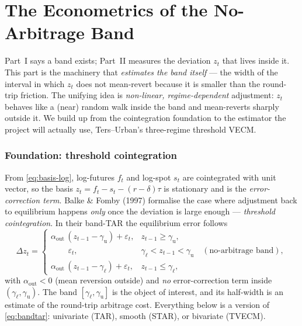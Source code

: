 \part{The Econometrics of the No-Arbitrage Band}
\label{part:econometrics}

Part~I says a band exists; Part~II measures the deviation $z_t$ that lives inside it. This part is the machinery that \emph{estimates the band itself} --- the width of the interval in which $z_t$ does not mean-revert because it is smaller than the round-trip friction. The unifying idea is \emph{non-linear, regime-dependent} adjustment: $z_t$ behaves like a (near) random walk inside the band and mean-reverts sharply outside it. We build up from the cointegration foundation to the estimator the project will actually use, Ters--Urban's three-regime threshold VECM.

\section{Foundation: threshold cointegration}
\label{sec:threshold-coint}
From \eqref{eq:basis-log}, log-futures $f_t$ and log-spot $s_t$ are cointegrated with unit vector, so the basis $z_t = f_t - s_t - (r-\delta)\tau$ is stationary and is the \emph{error-correction term}. Balke \& Fomby (1997) formalise the case where adjustment back to equilibrium happens \emph{only} once the deviation is large enough --- \emph{threshold cointegration}. In their band-TAR the equilibrium error follows
\begin{equation}
\Delta z_t = \begin{cases} \alpha_{\text{out}}\,(z_{t-1}-\gamma_{\text{u}}) + \varepsilon_t, & z_{t-1} \ge \gamma_{\text{u}},\\[3pt] \phantom{\alpha_{\text{out}}(}\varepsilon_t, & \gamma_{\ell} < z_{t-1} < \gamma_{\text{u}} \quad(\text{no-arbitrage band}),\\[3pt] \alpha_{\text{out}}\,(z_{t-1}-\gamma_{\ell}) + \varepsilon_t, & z_{t-1} \le \gamma_{\ell}, \end{cases} \label{eq:bandtar}
\end{equation}
with $\alpha_{\text{out}}<0$ (mean reversion outside) and \emph{no} error-correction term inside $(\gamma_\ell,\gamma_{\text{u}})$. The band $[\gamma_\ell,\gamma_{\text{u}}]$ is the object of interest, and its half-width is an estimate of the round-trip arbitrage cost. Everything below is a version of \eqref{eq:bandtar}: univariate (TAR), smooth (STAR), or bivariate (TVECM).

